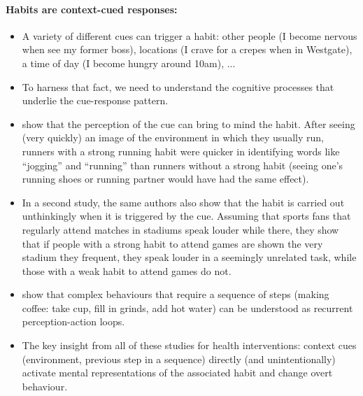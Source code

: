 \documentclass[a4paper, 11pt]{report}
\begin{document}
\paragraph{Habits are context-cued responses:}
\begin{itemize}
	\item A variety of different cues can trigger a habit: other people (I become nervous when see my former boss), locations (I crave for a crepes when in Westgate), a time of day (I become hungry around 10am), ...

	\item To harness that fact, we need to understand the cognitive processes that underlie the cue-response pattern.

	\item \citet{neal2012habits} show that the perception of the cue can bring to mind the habit. After seeing (very quickly) an image of the environment in which they usually run, runners with a strong running habit were quicker in identifying words like ``jogging'' and ``running'' than runners without a strong habit (seeing one's running shoes or running partner would have had the same effect).

	\item In a second study, the same authors also show that the habit is carried out unthinkingly when it is triggered by the cue. Assuming that sports fans that regularly attend matches in stadiums speak louder while there, they show that if people with a strong habit to attend games are shown the very stadium they frequent, they speak louder in a seemingly unrelated task, while those with a weak habit to attend games do not.

	\item \citet{botvinick2004doing} show that complex behaviours that require a sequence of steps (making coffee: take cup, fill in grinds, add hot water) can be understood as recurrent perception-action loops.

	\item The key insight from all of these studies for health interventions: context cues (environment, previous step in a sequence) directly (and unintentionally) activate mental representations of the associated habit and change overt behaviour.
\end{itemize}
\end{document}
